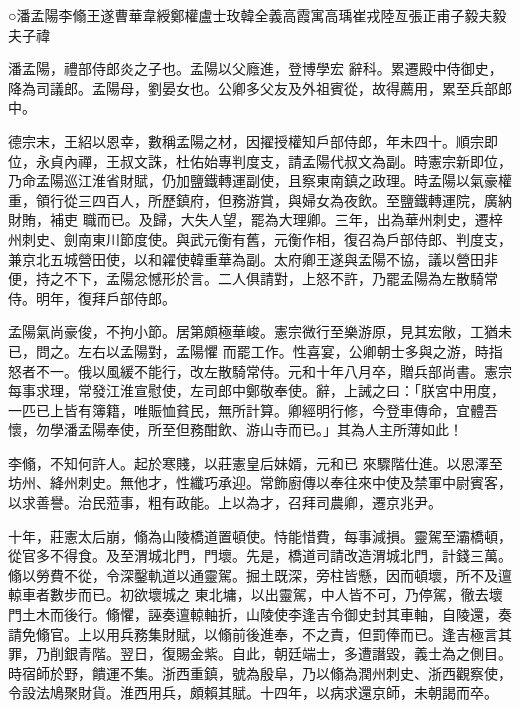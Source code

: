 
\begin{pinyinscope}

 ○潘孟陽李翛王遂曹華韋綬鄭權盧士玫韓全義高霞寓高瑀崔戎陸亙張正甫子毅夫毅夫子禕



 潘孟陽，禮部侍郎炎之子也。孟陽以父廕進，登博學宏
 辭科。累遷殿中侍御史，降為司議郎。孟陽母，劉晏女也。公卿多父友及外祖賓從，故得薦用，累至兵部郎中。



 德宗末，王紹以恩幸，數稱孟陽之材，因擢授權知戶部侍郎，年未四十。順宗即位，永貞內禪，王叔文誅，杜佑始專判度支，請孟陽代叔文為副。時憲宗新即位，乃命孟陽巡江淮省財賦，仍加鹽鐵轉運副使，且察東南鎮之政理。時孟陽以氣豪權重，領行從三四百人，所歷鎮府，但務游賞，與婦女為夜飲。至鹽鐵轉運院，廣納財賄，補吏
 職而已。及歸，大失人望，罷為大理卿。三年，出為華州刺史，遷梓州刺史、劍南東川節度使。與武元衡有舊，元衡作相，復召為戶部侍郎、判度支，兼京北五城營田使，以和糴使韓重華為副。太府卿王遂與孟陽不協，議以營田非便，持之不下，孟陽忿憾形於言。二人俱請對，上怒不許，乃罷孟陽為左散騎常侍。明年，復拜戶部侍郎。



 孟陽氣尚豪俊，不拘小節。居第頗極華峻。憲宗微行至樂游原，見其宏敞，工猶未已，問之。左右以孟陽對，孟陽懼
 而罷工作。性喜宴，公卿朝士多與之游，時指怒者不一。俄以風緩不能行，改左散騎常侍。元和十年八月卒，贈兵部尚書。憲宗每事求理，常發江淮宣慰使，左司郎中鄭敬奉使。辭，上誡之曰：「朕宮中用度，一匹已上皆有簿籍，唯賑恤貧民，無所計算。卿經明行修，今登車傳命，宜體吾懷，勿學潘孟陽奉使，所至但務酣飲、游山寺而已。」其為人主所薄如此！



 李翛，不知何許人。起於寒賤，以莊憲皇后妹婿，元和已
 來驟階仕進。以恩澤至坊州、絳州刺史。無他才，性纖巧承迎。常飾廚傳以奉往來中使及禁軍中尉賓客，以求善譽。治民蒞事，粗有政能。上以為才，召拜司農卿，遷京兆尹。



 十年，莊憲太后崩，翛為山陵橋道置頓使。恃能惜費，每事減損。靈駕至灞橋頓，從官多不得食。及至渭城北門，門壞。先是，橋道司請改造渭城北門，計錢三萬。翛以勞費不從，令深鑿軌道以通靈駕。掘土既深，旁柱皆懸，因而頓壞，所不及邅輬車者數步而已。初欲壞城之
 東北墉，以出靈駕，中人皆不可，乃停駕，徹去壞門土木而後行。翛懼，誣奏邅輬軸折，山陵使李逢吉令御史封其車軸，自陵還，奏請免翛官。上以用兵務集財賦，以翛前後進奉，不之責，但罰俸而已。逢吉極言其罪，乃削銀青階。翌日，復賜金紫。自此，朝廷端士，多遭譖毀，義士為之側目。時宿師於野，饋運不集。浙西重鎮，號為殷阜，乃以翛為潤州刺史、浙西觀察使，令設法鳩聚財貨。淮西用兵，頗賴其賦。十四年，以病求還京師，未朝謁而卒。




\end{pinyinscope}
